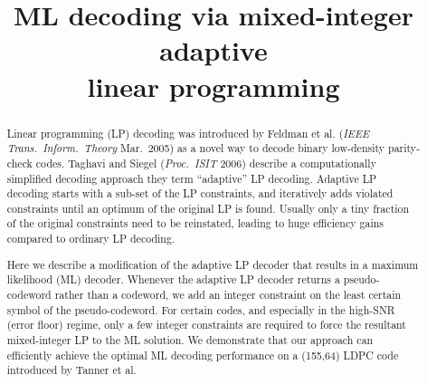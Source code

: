 \documentclass[10pt,conference]{styles/IEEEtran}
\begin{document}
\title{ML decoding via mixed-integer adaptive \\ linear programming}


\author{
\and
{}
\and
{}
}

\maketitle

\begin{abstract}

Linear programming (LP) decoding was introduced by Feldman et
al. ({\em IEEE Trans.~Inform.~Theory} Mar.~2005) as a novel way to
decode binary low-density parity-check codes.  Taghavi and Siegel
({\em Proc.~ISIT} 2006) describe a computationally simplified decoding
approach they term ``adaptive'' LP decoding.  Adaptive LP decoding
starts with a sub-set of the LP constraints, and iteratively adds
violated constraints until an optimum of the original LP is
found. Usually only a tiny fraction of the original constraints need
to be reinstated, leading to huge efficiency gains compared to
ordinary LP decoding.

Here we describe a modification of the adaptive LP decoder that
results in a maximum likelihood (ML) decoder. Whenever the adaptive LP
decoder returns a pseudo-codeword rather than a codeword, we add an
integer constraint on the least certain symbol of the pseudo-codeword.
For certain codes, and especially in the high-SNR (error floor)
regime, only a few integer constraints are required to force the
resultant mixed-integer LP to the ML solution.  We demonstrate that
our approach can efficiently achieve the optimal ML decoding
performance on a (155,64) LDPC code introduced by Tanner et al.
\end{abstract}
\end{document}
